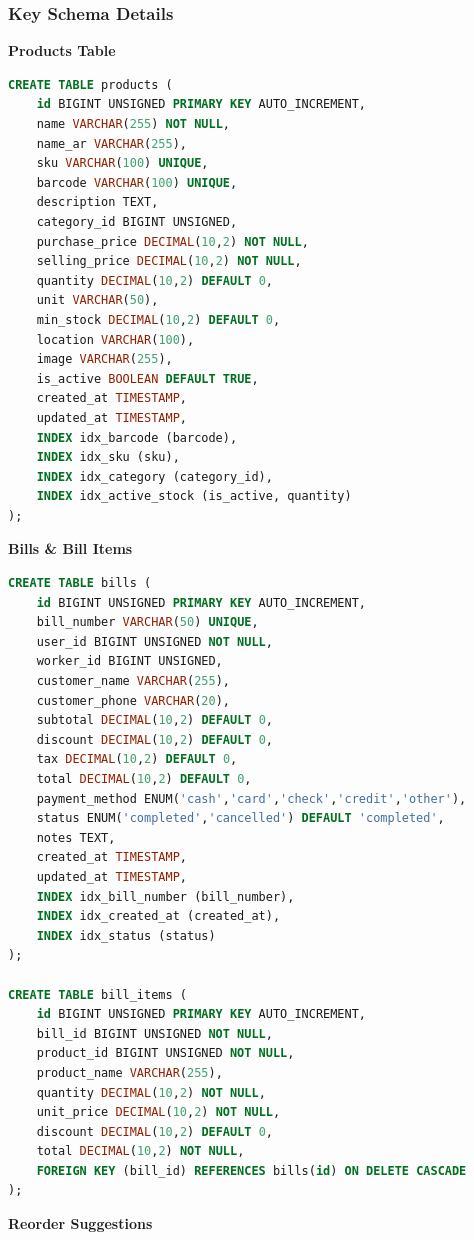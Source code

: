 \subsubsection{Key Schema Details}

\textbf{Products Table}

\begin{lstlisting}[language=SQL]
CREATE TABLE products (
    id BIGINT UNSIGNED PRIMARY KEY AUTO_INCREMENT,
    name VARCHAR(255) NOT NULL,
    name_ar VARCHAR(255),
    sku VARCHAR(100) UNIQUE,
    barcode VARCHAR(100) UNIQUE,
    description TEXT,
    category_id BIGINT UNSIGNED,
    purchase_price DECIMAL(10,2) NOT NULL,
    selling_price DECIMAL(10,2) NOT NULL,
    quantity DECIMAL(10,2) DEFAULT 0,
    unit VARCHAR(50),
    min_stock DECIMAL(10,2) DEFAULT 0,
    location VARCHAR(100),
    image VARCHAR(255),
    is_active BOOLEAN DEFAULT TRUE,
    created_at TIMESTAMP,
    updated_at TIMESTAMP,
    INDEX idx_barcode (barcode),
    INDEX idx_sku (sku),
    INDEX idx_category (category_id),
    INDEX idx_active_stock (is_active, quantity)
);
\end{lstlisting}

\textbf{Bills \& Bill Items}

\begin{lstlisting}[language=SQL]
CREATE TABLE bills (
    id BIGINT UNSIGNED PRIMARY KEY AUTO_INCREMENT,
    bill_number VARCHAR(50) UNIQUE,
    user_id BIGINT UNSIGNED NOT NULL,
    worker_id BIGINT UNSIGNED,
    customer_name VARCHAR(255),
    customer_phone VARCHAR(20),
    subtotal DECIMAL(10,2) DEFAULT 0,
    discount DECIMAL(10,2) DEFAULT 0,
    tax DECIMAL(10,2) DEFAULT 0,
    total DECIMAL(10,2) DEFAULT 0,
    payment_method ENUM('cash','card','check','credit','other'),
    status ENUM('completed','cancelled') DEFAULT 'completed',
    notes TEXT,
    created_at TIMESTAMP,
    updated_at TIMESTAMP,
    INDEX idx_bill_number (bill_number),
    INDEX idx_created_at (created_at),
    INDEX idx_status (status)
);

CREATE TABLE bill_items (
    id BIGINT UNSIGNED PRIMARY KEY AUTO_INCREMENT,
    bill_id BIGINT UNSIGNED NOT NULL,
    product_id BIGINT UNSIGNED NOT NULL,
    product_name VARCHAR(255),
    quantity DECIMAL(10,2) NOT NULL,
    unit_price DECIMAL(10,2) NOT NULL,
    discount DECIMAL(10,2) DEFAULT 0,
    total DECIMAL(10,2) NOT NULL,
    FOREIGN KEY (bill_id) REFERENCES bills(id) ON DELETE CASCADE
);
\end{lstlisting}

\textbf{Reorder Suggestions}

